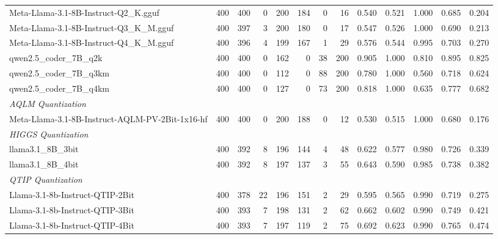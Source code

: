 \begin{table}[htbp]
{\begin{tabular}{lrrrrrrrrrrrr}
    Meta-Llama-3.1-8B-Instruct-Q2\_K.gguf & 400 & 400 & 0 & 200 & 184 & 0 & 16 & 0.540 & 0.521 & 1.000 & 0.685 & 0.204 \\
    Meta-Llama-3.1-8B-Instruct-Q3\_K\_M.gguf & 400 & 397 & 3 & 200 & 180 & 0 & 17 & 0.547 & 0.526 & 1.000 & 0.690 & 0.213 \\
    Meta-Llama-3.1-8B-Instruct-Q4\_K\_M.gguf & 400 & 396 & 4 & 199 & 167 & 1 & 29 & 0.576 & 0.544 & 0.995 & 0.703 & 0.270 \\
    qwen2.5\_coder\_7B\_q2k & 400 & 400 & 0 & 162 & 0 & 38 & 200 & 0.905 & 1.000 & 0.810 & 0.895 & \cellcolor{green!10}0.825 \\
    qwen2.5\_coder\_7B\_q3km & 400 & 400 & 0 & 112 & 0 & 88 & 200 & 0.780 & 1.000 & 0.560 & 0.718 & 0.624 \\
    qwen2.5\_coder\_7B\_q4km & 400 & 400 & 0 & 127 & 0 & 73 & 200 & 0.818 & 1.000 & 0.635 & 0.777 & 0.682 \\
    \midrule
    \multicolumn{13}{l}{\textit{AQLM Quantization}} \\
    \midrule
    Meta-Llama-3.1-8B-Instruct-AQLM-PV-2Bit-1x16-hf & 400 & 400 & 0 & 200 & 188 & 0 & 12 & 0.530 & 0.515 & 1.000 & 0.680 & 0.176 \\
    \midrule
    \multicolumn{13}{l}{\textit{HIGGS Quantization}} \\
    \midrule
    llama3.1\_8B\_3bit & 400 & 392 & 8 & 196 & 144 & 4 & 48 & 0.622 & 0.577 & 0.980 & 0.726 & 0.339 \\
    llama3.1\_8B\_4bit & 400 & 392 & 8 & 197 & 137 & 3 & 55 & 0.643 & 0.590 & 0.985 & 0.738 & 0.382 \\
    \midrule
    \multicolumn{13}{l}{\textit{QTIP Quantization}} \\
    \midrule
    Llama-3.1-8b-Instruct-QTIP-2Bit & 400 & 378 & 22 & 196 & 151 & 2 & 29 & 0.595 & 0.565 & 0.990 & 0.719 & 0.275 \\
    Llama-3.1-8b-Instruct-QTIP-3Bit & 400 & 393 & 7 & 198 & 131 & 2 & 62 & 0.662 & 0.602 & 0.990 & 0.749 & 0.421 \\
    Llama-3.1-8b-Instruct-QTIP-4Bit & 400 & 393 & 7 & 197 & 119 & 2 & 75 & 0.692 & 0.623 & 0.990 & 0.765 & 0.474 \\
    \bottomrule
  \end{tabular}
  }
\end{table}


